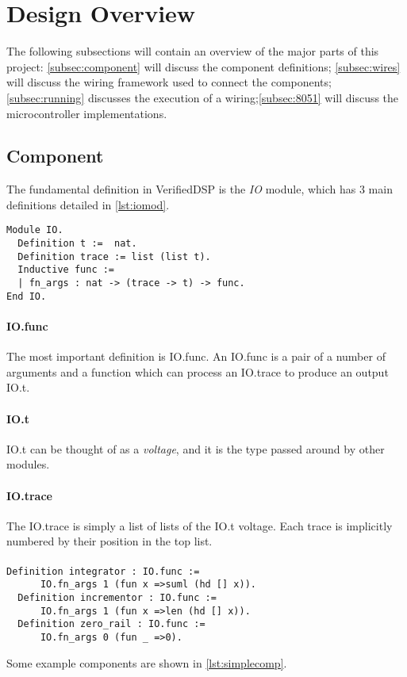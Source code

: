 \documentclass[preprint,12pt]{sigplanconf}
\begin{document}
\section{Design Overview}
The following subsections will contain an overview of the major parts of
this project: \autoref{subsec:component} will discuss the component
definitions; \autoref{subsec:wires} will discuss the wiring framework
used to connect the components; \autoref{subsec:running} discusses the
execution of a wiring;\autoref{subsec:8051} will discuss the microcontroller implementations.


\subsection{Component} \label{subsec:component}

The fundamental definition in VerifiedDSP is the \emph{IO} module, which
has 3 main definitions detailed in \autoref{lst:iomod}.
\begin{lstlisting}[language=Coq,label={lst:iomod},caption={IO module definition}]
Module IO.
  Definition t :=  nat.
  Definition trace := list (list t).
  Inductive func :=
  | fn_args : nat -> (trace -> t) -> func.
End IO.
\end{lstlisting}

\paragraph{IO.func}
The most important definition is IO.func. An IO.func is a pair of a
number of arguments and a function which can process an IO.trace to produce
an output IO.t.
\paragraph{IO.t} IO.t can be thought of as a \emph{voltage}, and it is the type passed
around by other modules.
\paragraph{IO.trace}
The IO.trace is simply a list of lists of the IO.t voltage. Each trace is
implicitly numbered by their position in the top list.
\paragraph*{}
\begin{lstlisting}[language=Coq, caption={An
integration unit, an incrementing unit, and an always 0 ``rail''},
label={lst:simplecomp}]
  Definition integrator : IO.func :=
      IO.fn_args 1 (fun x =>suml (hd [] x)).
  Definition incrementor : IO.func := 
      IO.fn_args 1 (fun x =>len (hd [] x)).
  Definition zero_rail : IO.func := 
      IO.fn_args 0 (fun _ =>0).
\end{lstlisting}
Some example components are shown in \autoref{lst:simplecomp}.
\end{document}

